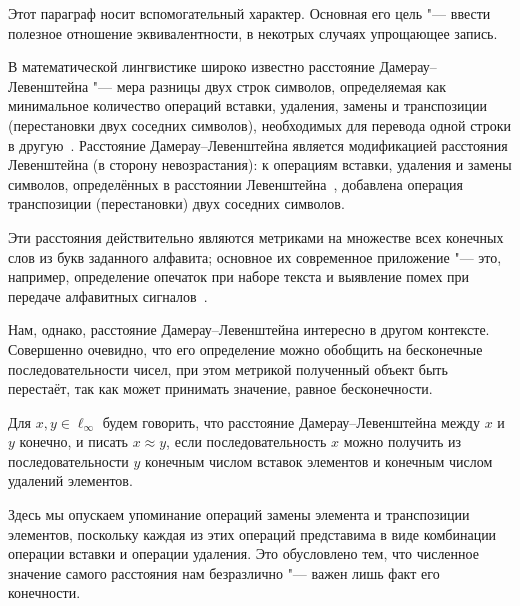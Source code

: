 Этот параграф носит вспомогательный характер.
Основная его цель "--- ввести полезное отношение эквивалентности,
в некотрых случаях упрощающее запись.

В математической лингвистике широко известно расстояние Дамерау--Левенштейна
"---
мера разницы двух строк символов, определяемая как минимальное количество операций вставки,
удаления, замены и транспозиции (перестановки двух соседних символов),
необходимых для перевода одной строки в другую~\cite{damerau1964technique,wagner1974string,gasfield2003strings}.
Расстояние Дамерау--Левенштейна является модификацией расстояния Левенштейна (в сторону невозрастания):
к операциям вставки, удаления и замены символов, определённых в расстоянии Левенштейна~\cite{levenstein1965binary},
добавлена операция транспозиции (перестановки) двух соседних символов.

Эти расстояния действительно являются метриками на множестве всех конечных слов из букв заданного алфавита;
основное их современное приложение "--- это, например, определение опечаток при наборе текста
и выявление помех при передаче алфавитных сигналов~\cite{oommen1997pattern,brill2000improved,bard2006spelling,li2006exploring}.


Нам, однако, расстояние Дамерау--Левенштейна интересно в другом контексте.
Совершенно очевидно, что его определение можно обобщить на бесконечные последовательности чисел,
при этом метрикой полученный объект быть перестаёт,
так как может принимать значение, равное бесконечности.

\begin{definition}
	\label{def:Damerau_Levenshein_distance}
	Для $x, y \in \ell_\infty$ будем говорить,
	что расстояние Дамерау--Левенштейна между $x$ и $y$ конечно,
	и писать $x\approx y$,
	если последовательность $x$ можно получить из последовательности $y$
	конечным числом вставок элементов и конечным числом удалений элементов.
\end{definition}

\begin{remark}
	Здесь мы опускаем упоминание операций замены элемента и транспозиции элементов,
	поскольку каждая из этих операций представима в виде комбинации операции вставки и операции удаления.
	Это обусловлено тем, что численное значение самого расстояния нам безразлично "---
	важен лишь факт его конечности.
\end{remark}

